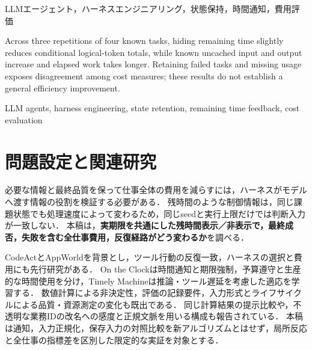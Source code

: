 \documentclass[letter]{ieicej}
\begin{document}
\maketitle
\begin{abstract}
状態保持型LLMエージェントの残時間通知を既知４課題で比較する. 欠測を保持した３反復では, 非表示の論理token合計が条件付きで減る一方, cacheを除く入力と出力は増えた. 成否と指標別費用を全条件で評価する必要性を示す.
\end{abstract}
\begin{keyword}LLMエージェント，ハーネスエンジニアリング，状態保持，時間通知，費用評価\end{keyword}
\begin{eabstract}
Across three repetitions of four known tasks, hiding remaining time slightly reduces conditional logical-token totals, while known uncached input and output increase and elapsed work takes longer. Retaining failed tasks and missing usage exposes disagreement among cost measures; these results do not establish a general efficiency improvement.
\end{eabstract}
\begin{ekeyword}LLM agents, harness engineering, state retention, remaining time feedback, cost evaluation\end{ekeyword}
\section{問題設定と関連研究}
必要な情報と最終品質を保って仕事全体の費用を減らすには，ハーネスがモデルへ渡す情報の役割を検証する必要がある．
残時間のような制御情報は，同じ課題状態でも処理速度によって変わるため，同じseedと実行上限だけでは判断入力が一致しない．
本稿は，\textbf{実期限を共通にした残時間表示／非表示で，最終成否，失敗を含む全仕事費用，反復経路がどう変わるか}を調べる．

CodeAct\cite{codeact}とAppWorld\cite{appworld}を背景とし，ツール行動の反復一致\cite{consistency}，ハーネスの選択と費用\cite{beyondprompts}にも先行研究がある．
On the Clock\cite{clock}は時間通知と期限強制，予算遵守と生産的な時間使用を分け，Timely Machine\cite{timely}は推論・ツール遅延を考慮した適応を学習する．
数値計算による非決定性\cite{nondeterminism}，評価の記録要件\cite{repro}，入力形式とライフサイクルによる品質・資源測定の変化\cite{localprotocol}も既出である．
同じ計算結果の提示比較\cite{delivery}や，不透明な業務IDの改名への感度と正規文脈を用いる構成\cite{canonical}も報告されている．
本稿は通知，入力正規化，保存入力の対照比較を新アルゴリズムとはせず，局所反応と全仕事の指標差を区別した限定的な実証を対象とする．
\end{document}
